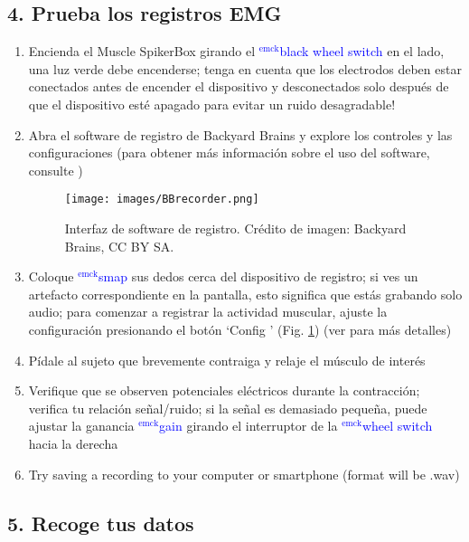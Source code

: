\documentclass[12pt]{article}
\newcommand{\emck}[1]{\textcolor{blue}{$^{\textrm{emck}}${#1}}}
\begin{document}
\subsection*{4. Prueba los registros EMG}

\begin{enumerate}
\item Encienda el Muscle SpikerBox girando el \emck{black wheel
  switch} en el lado, una luz verde debe encenderse; tenga en cuenta
  que los electrodos deben estar conectados antes de encender el
  dispositivo y desconectados solo después de que el dispositivo
  esté apagado para evitar un ruido desagradable!
\item Abra el software de registro de Backyard Brains y explore los
  controles y las configuraciones (para obtener más información sobre
  el uso del software, consulte \cite{spikeRecorder})

\begin{figure}[h!]
\centering
\texttt{[image: images/BBrecorder.png]}
\caption{Interfaz de software de registro. Crédito de imagen: Backyard
  Brains, CC BY SA.}
\label{fig:recorder}
\end{figure}

\item Coloque \emck{smap} sus dedos cerca del dispositivo de registro;
  si ves un artefacto correspondiente en la pantalla, esto significa
  que estás grabando solo audio; para comenzar a registrar la
  actividad muscular, ajuste la configuración presionando el botón
  `Config ' (Fig. \ref{fig:recorder}) (ver
  \cite{spikeRecorder} para más detalles)
\item Pídale al sujeto que brevemente contraiga y relaje el músculo de
  interés
\item Verifique que se observen potenciales eléctricos durante la
  contracción; verifica tu relación señal/ruido; si la señal es
  demasiado pequeña, puede ajustar la ganancia \emck{gain} girando el
  interruptor de la \emck{wheel switch} hacia la derecha
\item Try saving a recording to your computer or smartphone (format
  will be .wav)
\end{enumerate}

\subsection*{5. Recoge tus datos}
\end{document}
